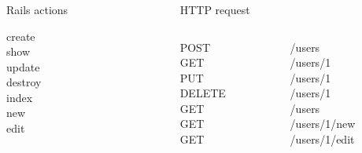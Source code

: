 
\begin{frame}
  \frametitle{\insertsection}
  \begin{columns}
    \begin{column}{2.5cm}
      \begin{center}Rails actions\\\end{center}
        create\\
        show\\
        update\\
        destroy\\
        index\\
        new\\
        edit
    \end{column}
    \begin{column}{3.5cm}
      \begin{center}HTTP request\\\end{center}
        \begin{columns}
          \begin{column}{1.5cm}
            POST\\
            GET\\
            PUT\\
            DELETE\\
            GET\\
            GET\\
            GET
          \end{column}
          \begin{column}{2cm}
            /users\\
            /users/1\\
            /users/1\\
            /users/1\\
            /users\\
            /users/1/new\\
            /users/1/edit
          \end{column}
        \end{columns}
    \end{column}
  \end{columns}
\end{frame}



